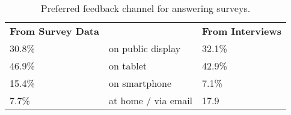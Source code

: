 \begin{table}[h]
\center
\begin{tabular}{lllll}
\multicolumn{2}{l}{\textbf{From Survey Data}} &  & \multicolumn{2}{l}{\textbf{From Interviews}} \\
30.8\%                   & \multicolumn{3}{l}{on public display}    & 32.1\%                  \\
46.9\%                   & \multicolumn{3}{l}{on tablet}            & 42.9\%                  \\
15.4\%                   & \multicolumn{3}{l}{on smartphone}        & 7.1\%                   \\
7.7\%                    & \multicolumn{3}{l}{at home / via email}  & 17.9                   
\end{tabular}
\caption[Feedback Channel]{Preferred feedback channel for answering surveys.}
\label{table:5-feedback-channel}
\end{table}